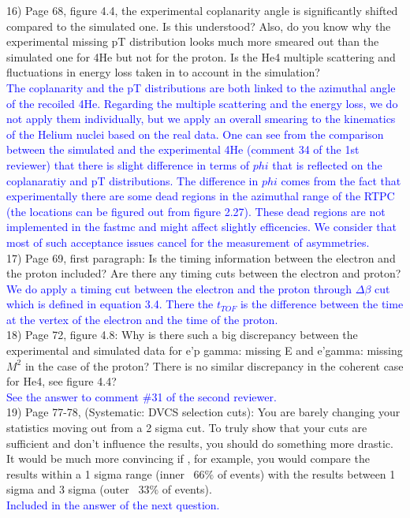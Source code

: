 16) Page 68, figure 4.4, the experimental coplanarity angle is significantly 
shifted compared to the simulated one. Is this understood? Also, do you know 
why the experimental missing pT distribution looks much more smeared out than 
the simulated one for 4He but not for the proton. Is the He4 multiple 
scattering and fluctuations in energy loss taken in to account in the 
simulation?  \\
\textcolor{blue}{
   The coplanarity and the pT distributions are both linked to the azimuthal 
   angle of the recoiled 4He. Regarding the multiple scattering and the energy 
   loss, we do not apply them individually, but we apply an overall smearing to 
   the kinematics of the Helium nuclei based on the real data. One can see from 
   the comparison between the simulated and the experimental 4He (comment 34 of 
   the 1st reviewer) that there is slight difference in terms of $phi$ that is 
   reflected on the coplanaratiy and pT distributions. The difference in $phi$ 
   comes from the fact that experimentally there are some dead regions in the 
   azimuthal range of the RTPC (the locations can be figured out from figure 
   2.27). These dead regions are not implemented in the fastmc and might affect 
   slightly efficencies. We consider that most of such acceptance issues 
   cancel for the measurement of asymmetries.}\\

17) Page 69, first paragraph:  Is the timing information between the electron 
and the proton included? Are there any timing cuts between the electron and 
proton? \\
\textcolor{blue}{ We do apply a timing cut between the electron and the proton 
   through $\Delta \beta$ cut which is defined in equation 3.4. There the 
   $t_{TOF}$ is the difference between the time at the vertex of the electron 
and the time of the proton.}\\  

18) Page 72, figure 4.8: Why is there such a big discrepancy between the 
experimental and simulated data for e'p gamma: missing E  and  e'gamma: missing 
$M^{2}$ in the case of the proton?  There is no similar discrepancy in the 
coherent case for He4, see figure 4.4?  \\
\textcolor{blue}{ See the answer to comment \#31 of the second reviewer.}\\

19) Page 77-78, (Systematic: DVCS selection cuts): You are barely changing your 
statistics moving out from a 2 sigma cut. To truly show that your cuts are 
sufficient and don't influence the results, you should do something more 
drastic. It would be much more convincing if , for example, you would compare 
the results within a 1 sigma range (inner ~66$\%$ of events) with the results 
between 1 sigma and 3 sigma (outer ~33$\%$ of events).\\
 \textcolor{blue}{Included in the answer of the next question.}\\

